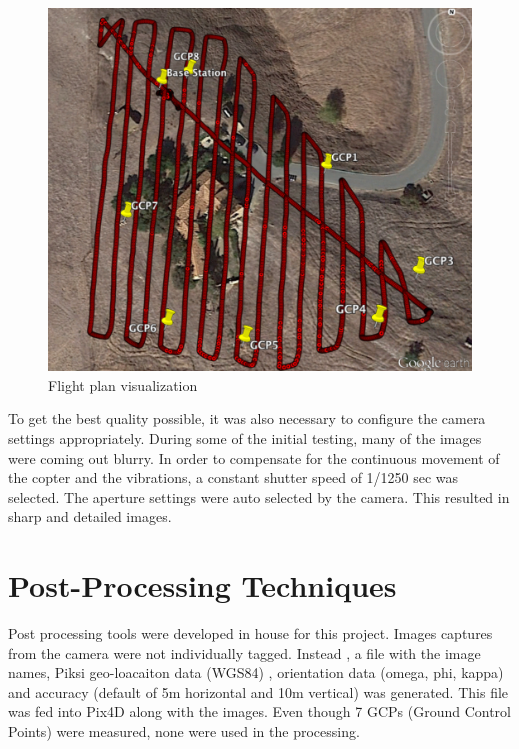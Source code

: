 \documentclass{article}
\begin{document}
\begin{figure}
\begin{center}
\includegraphics[width=5in]{images/flight_plan_gcp.png}
\caption{Flight plan visualization}
\label{flightplan}
\end{center}
\end{figure}

To get the best quality possible, it was also necessary to configure the camera settings appropriately. During some of the initial testing, many of the images were coming out blurry. In order to compensate for the continuous movement of the copter and the vibrations, a constant shutter speed of 1/1250 sec was selected. The aperture settings were auto selected by the camera. This resulted in sharp and detailed images.

\section{Post-Processing Techniques}
\label{sec:epostprocessing}
Post processing tools were developed in house for this project. Images captures from the camera were not individually tagged. Instead , a file with the image names, Piksi geo-loacaiton data (WGS84) , orientation data (omega, phi, kappa) and accuracy (default of 5m horizontal and 10m vertical) was generated. This file was fed into Pix4D along with the images. Even though 7 GCPs (Ground Control Points) were measured, none were used in the processing.
\end{document}
